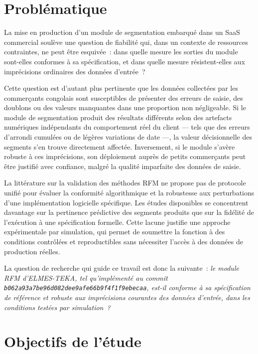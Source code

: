 \section*{Problématique}

La mise en production d'un module de segmentation embarqué dans un SaaS commercial soulève
une question de fiabilité qui, dans un contexte de ressources contraintes, ne peut être
esquivée~: dans quelle mesure les sorties du module sont-elles conformes à sa spécification, et
dans quelle mesure résistent-elles aux imprécisions ordinaires des données d'entrée~?

Cette question est d'autant plus pertinente que les données collectées par les commerçants
congolais sont susceptibles de présenter des erreurs de saisie, des doublons ou des valeurs
manquantes dans une proportion non négligeable. Si le module de segmentation produit des
résultats différents selon des artefacts numériques indépendants du comportement réel du
client — tels que des erreurs d'arrondi cumulées ou de légères variations de date —, la
valeur décisionnelle des segments s'en trouve directement affectée. Inversement, si le module
s'avère robuste à ces imprécisions, son déploiement auprès de petits commerçants peut être
justifié avec confiance, malgré la qualité imparfaite des données de saisie.

La littérature sur la validation des méthodes RFM \citep{Rajendran2024, Mingmongkhol2023,
Ray2023} ne propose pas de protocole unifié pour évaluer la conformité algorithmique et la
robustesse aux perturbations d'une implémentation logicielle spécifique. Les études
disponibles se concentrent davantage sur la pertinence prédictive des segments produits que
sur la fidélité de l'exécution à une spécification formelle. Cette lacune justifie une
approche expérimentale par simulation, qui permet de soumettre la fonction à des conditions
contrôlées et reproductibles sans nécessiter l'accès à des données de production réelles.

La question de recherche qui guide ce travail est donc la suivante~: \emph{le module RFM
d'ELMES-TEKA, tel qu'implémenté au commit \texttt{b062a93a7be96d082dee9afe66b9f4f1f9ebecaa},
est-il conforme à sa spécification de référence et robuste aux imprécisions courantes des
données d'entrée, dans les conditions testées par simulation~?}

\section*{Objectifs de l'étude}

